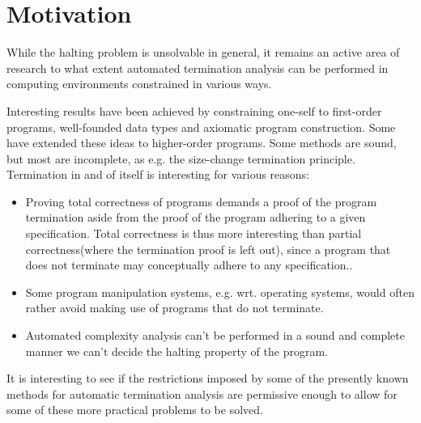 \section{Motivation}

While the halting problem is unsolvable in general, it remains an active area
of research to what extent automated termination analysis can be performed in 
computing environments constrained in various ways.

Interesting results have been achieved by constraining one-self to first-order 
programs, well-founded data types and axiomatic program construction. Some have 
extended these ideas to higher-order programs. Some methods are sound, but most 
are incomplete, as e.g.  the size-change termination 
principle\cite{size-change-2}. Termination in and of itself is interesting for 
various reasons:

\begin{itemize}

\item Proving total correctness of programs demands a proof of the program 
termination aside from the proof of the program adhering to a given 
specification.  Total correctness is thus more interesting than partial 
correctness(where the termination proof is left out), since a program that does 
not terminate may conceptually adhere to any 
specification.\cite{axiomatic-total-correctness}.

\item Some program manipulation systems, e.g. wrt. operating systems, would 
often rather avoid making use of programs that do not terminate\cite{windows}.

\item Automated complexity analysis can't be performed in a sound and complete 
manner we can't decide the halting property of the 
program\cite{automatic-complexity-analysis}. 

\end{itemize}

It is interesting to see if the restrictions imposed by some of the presently 
known methods for automatic termination analysis are permissive enough to allow 
for some of these more practical problems to be solved.
